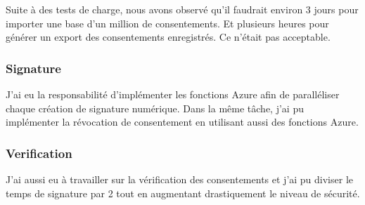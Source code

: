 \documentclass[12pt, a4paper]{report}
\begin{document}
                Suite à des tests de charge, nous avons observé qu'il faudrait environ 3 jours pour importer une base d'un million de consentements. Et plusieurs heures pour générer un export des consentements enregistrés. Ce n'était pas acceptable.
                \subsubsection{Signature}
                J'ai eu la responsabilité d'implémenter les fonctions Azure afin de paralléliser chaque création de signature numérique.\newline
                Dans la même tâche, j'ai pu implémenter la révocation de consentement en utilisant aussi des fonctions Azure.
                \subsubsection{Verification}
                J'ai aussi eu à travailler sur la vérification des consentements et j'ai pu diviser le temps de signature par 2 tout en augmentant drastiquement le niveau de sécurité.
\end{document}
